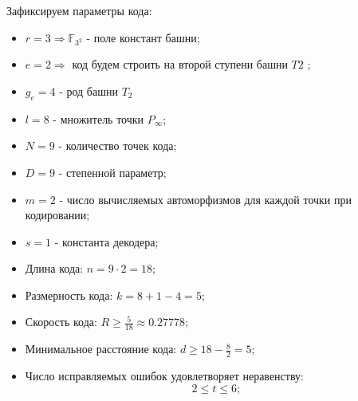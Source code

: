 \documentclass{article}
\def\F{\mathbb{F}}
\numberwithin{equation}{section}
\begin{document}
Зафиксируем параметры кода:
\begin{itemize}
	\item $ r = 3 \Rightarrow  \F_{3^2} $ - поле констант башни;
	\item $ e = 2 \Rightarrow $ код будем строить  на второй ступени башни $ T2 $ ;
	\item $ g_e = 4 $ - род башни $ T_2 $
	\item $ l = 8 $ - множитель точки $ P_{\infty} $;
	\item $ N = 9 $ - количество точек кода;
	\item $ D = 9 $ - степенной параметр;
	\item $ m = 2 $ - число вычисляемых автоморфизмов для каждой точки при кодировании;
	\item $ s = 1 $ - константа декодера;
	\item Длина кода: $ n = 9 \cdot 2 = 18 $;
	\item Размерность кода: $ k = 8+1-4 = 5 $;
	\item Скорость кода: $ R \geq \frac{5}{18} \approx 0.27778 $;
	\item Минимальное расстояние кода: $ d \geq 18 - \frac{8}{2} = 5 $;
	\item Число исправляемых ошибок удовлетворяет неравенству:
	\[
	 2 \leq t \leq 6;
	\]
\end{itemize}
\end{document}
